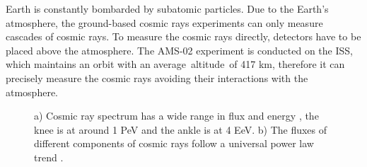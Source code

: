 Earth is constantly bombarded by subatomic particles. Due to the Earth’s atmosphere, the ground-based cosmic rays experiments can only measure cascades of cosmic rays. To measure the cosmic rays directly, detectors have to be placed above the atmosphere. The AMS-02 experiment is conducted on the ISS, which maintains an orbit with an average altitude of 417 km, therefore it can precisely measure the cosmic rays avoiding their interactions with the atmosphere. \par

\begin{figure}[H]    
\caption[Cosmic ray spectrum and components]{a) Cosmic ray spectrum has a wide range in flux and energy \cite{CosmicRaysKneeAndAnkle}, the knee is at around 1 PeV and the ankle is at 4 EeV. b) The fluxes of different components of cosmic rays follow a universal power law trend \cite{PDG2020}. }
\end{figure}

